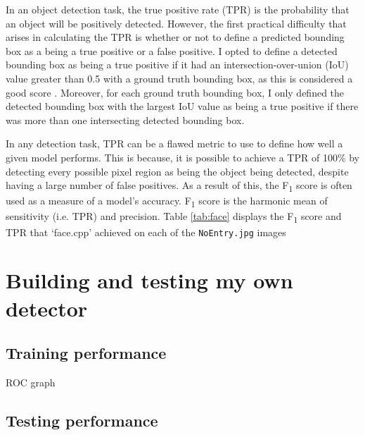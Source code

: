 \documentclass[twocolumn, 10pt, a4paper]{article}
\begin{document}
In an object detection task, the true positive rate (TPR) is the probability that an object will be positively detected.
However, the first practical difficulty that arises in calculating the TPR is whether or not to define a predicted bounding box as a being a true positive or a false positive.
I opted to define a detected bounding box as being a true positive if it had an intersection-over-union (IoU) value greater than 0.5 with a ground truth bounding box, as this is considered a good score \cite{iou}.
Moreover, for each ground truth bounding box, I only defined the detected bounding box with the largest IoU value as being a true positive if there was more than one intersecting detected bounding box.

In any detection task, TPR can be a flawed metric to use to define how well a given model performs.
This is because, it is possible to achieve a TPR of 100\% by detecting every possible pixel region as being the object being detected, despite having a large number of false positives.
As a result of this, the F\textsubscript{1} score is often used as a measure of a model's accuracy.
F\textsubscript{1} score is the harmonic mean of sensitivity (i.e. TPR) and precision.
Table \ref{tab:face} displays the F\textsubscript{1} score and TPR that `face.cpp' achieved on each of the \texttt{NoEntry\textasteriskcentered.jpg} images

\clearpage

\section{Building and testing my own detector}

\subsection{Training performance}

ROC graph

\subsection{Testing performance}
\end{document}
